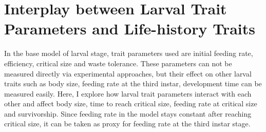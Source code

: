 \chapter{Interplay between Larval Trait Parameters and Life-history Traits}
In the base model of larval stage, trait parameters used are initial feeding rate, efficiency, critical size and waste tolerance. These parameters can not be measured directly via experimental approaches, but their effect on other larval traits such as body size, feeding rate at the third instar, development time can be measured easily. Here, I explore how larval trait parameters interact with each other and affect body size, time to reach critical size, feeding rate at critical size and survivorship. Since feeding rate in the model stays constant after reaching critical size, it can be taken as proxy for feeding rate at the third instar stage.

